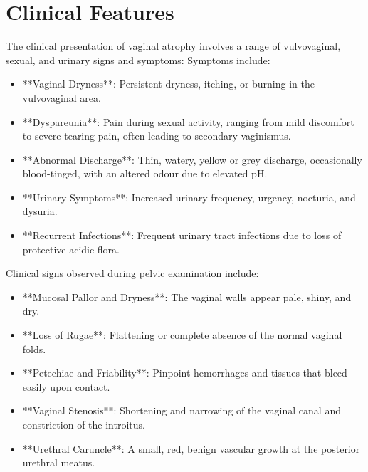 \section*{Clinical Features}
The clinical presentation of vaginal atrophy involves a range of vulvovaginal, sexual, and urinary signs and symptoms:
Symptoms include:
\begin{itemize}
\item **Vaginal Dryness**: Persistent dryness, itching, or burning in the vulvovaginal area.
\item **Dyspareunia**: Pain during sexual activity, ranging from mild discomfort to severe tearing pain, often leading to secondary vaginismus.
\item **Abnormal Discharge**: Thin, watery, yellow or grey discharge, occasionally blood-tinged, with an altered odour due to elevated pH.
\item **Urinary Symptoms**: Increased urinary frequency, urgency, nocturia, and dysuria.
\item **Recurrent Infections**: Frequent urinary tract infections due to loss of protective acidic flora.
\end{itemize}
Clinical signs observed during pelvic examination include:
\begin{itemize}
\item **Mucosal Pallor and Dryness**: The vaginal walls appear pale, shiny, and dry.
\item **Loss of Rugae**: Flattening or complete absence of the normal vaginal folds.
\item **Petechiae and Friability**: Pinpoint hemorrhages and tissues that bleed easily upon contact.
\item **Vaginal Stenosis**: Shortening and narrowing of the vaginal canal and constriction of the introitus.
\item **Urethral Caruncle**: A small, red, benign vascular growth at the posterior urethral meatus.
\end{itemize}

